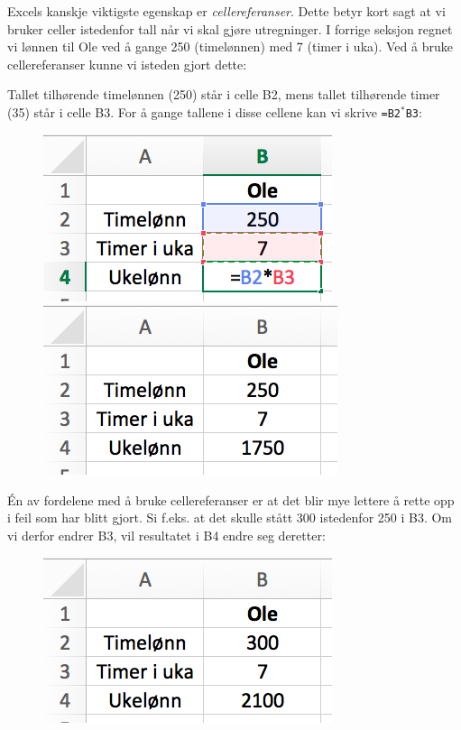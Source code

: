 Excels kanskje viktigste egenskap er \textit{cellereferanser}. Dette betyr kort sagt at vi bruker celler istedenfor tall når vi skal gjøre utregninger. I forrige seksjon regnet vi lønnen til Ole ved å gange 250 (timelønnen) med 7 (timer i uka). Ved å bruke cellereferanser kunne vi isteden gjort dette:\vsk

Tallet tilhørende timelønnen (250) står i celle B2, mens tallet tilhørende timer (35) står i celle B3. For å gange tallene i disse cellene kan vi skrive {\tt =B2$ ^* $B3}: 

\begin{figure}[H]
	\centering
	\includegraphics[scale=0.3]{figs/ex5}\qquad
	\includegraphics[scale=0.3]{figs/ex4}
\end{figure}
Én av fordelene med å bruke cellereferanser er at det blir mye lettere å rette opp i feil som har blitt gjort. Si f.eks. at det skulle stått 300 istedenfor 250 i B3. Om vi derfor endrer B3, vil resultatet i B4 endre seg deretter:
\begin{figure}[H]
	\centering
	\includegraphics[scale=0.3]{figs/ex6}
\end{figure}
